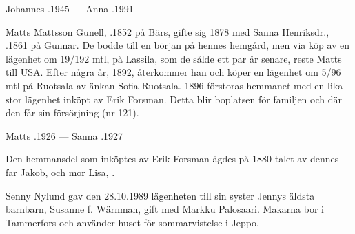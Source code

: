 Johannes .1945  ---  Anna .1991


%
Matts Mattsson Gunell, .1852 på Bärs, gifte sig 1878 med Sanna Henriksdr., .1861 på Gunnar. De bodde till en början på hennes hemgård, men via köp av en lägenhet om 19/192 mtl, på  Lassila, som de sålde ett par år senare, reste Matts till USA. Efter några år, 1892, återkommer han och köper en lägenhet om 5/96 mtl på Ruotsala av änkan Sofia Ruotsala. 1896 förstoras hemmanet med en lika stor lägenhet inköpt av Erik Forsman. Detta blir boplatsen för familjen och där den får sin försörjning (nr 121).
\begin{jhchildren}
  \item {}
  \item {}
  \item {}
  \item {}
  \item {}
  \item {}
  \item {}
  \item {}
  \item {}
  \item {}
\end{jhchildren}
Matts .1926  ---  Sanna .1927

Den hemmansdel som inköptes av Erik Forsman ägdes på 1880-talet av dennes far Jakob,  och mor Lisa, .



%


%
Senny Nylund gav den 28.10.1989 lägenheten till sin syster Jennys äldsta barnbarn, Susanne f. Wärnman, gift med Markku Palosaari. Makarna bor i Tammerfors och använder huset för sommarvistelse i Jeppo.\jhvspace{}


